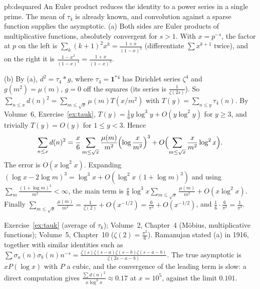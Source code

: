 \begin{solution}{pb:dsquared}
\idea An Euler product reduces the identity to a power series in a single prime. The mean of $\tau_4$ is already known, and convolution against a sparse function supplies the asymptotic.
\writeup (a) Both sides are Euler products of multiplicative functions, absolutely convergent for $s>1$. With $x=p^{-s}$, the
factor at $p$ on the left is $\sum_k(k+1)^2x^k=\frac{1+x}{(1-x)^3}$ (differentiate $\sum x^{k+1}$ twice), and on the right it is
$\frac{1-x^2}{(1-x)^4}=\frac{1+x}{(1-x)^3}$.

(b) By (a), $d^2=\tau_4*g$, where $\tau_4=\mathbf1^{*4}$ has Dirichlet series $\zeta^4$ and $g(m^2)=\mu(m)$, $g=0$ off the squares (its
series is $\frac1{\zeta(2s)}$). So $\sum_{n\le x}d(n)^2=\sum_{m\le\sqrt x}\mu(m)T(x/m^2)$ with $T(y)=\sum_{n\le y}\tau_4(n)$. By Volume~6,
Exercise~\ref{ex:tauk}, $T(y)=\frac16y\log^3y+O(y\log^2y)$ for $y\ge3$, and trivially $T(y)=O(y)$ for $1\le y<3$. Hence
\[
\sum_{n\le x}d(n)^2=\frac x6\sum_{m\le\sqrt x}\frac{\mu(m)}{m^2}\Bigl(\log\frac x{m^2}\Bigr)^3+O\Bigl(\sum_{m\le\sqrt x}\frac x{m^2}\log^2x\Bigr).
\]
The error is $O(x\log^2x)$. Expanding $(\log x-2\log m)^3=\log^3x+O(\log^2x\,(1+\log m)^3)$ and using $\sum_m\frac{(1+\log m)^3}{m^2}<\infty$,
the main term is $\frac x6\log^3x\sum_{m\le\sqrt x}\frac{\mu(m)}{m^2}+O(x\log^2x)$. Finally
$\sum_{m\le\sqrt x}\frac{\mu(m)}{m^2}=\frac1{\zeta(2)}+O(x^{-1/2})=\frac6{\pi^2}+O(x^{-1/2})$, and $\frac16\cdot\frac6{\pi^2}=\frac1{\pi^2}$.

\tools Exercise~\ref{ex:tauk} (average of $\tau_k$); Volume~2, Chapter~4 (Möbius, multiplicative functions); Volume~5, Chapter~10
($\zeta(2)=\frac{\pi^2}6$).
\leads Ramanujan stated (a) in 1916, together with similar identities such as $\sum\sigma_a(n)\sigma_b(n)n^{-s}=\frac{\zeta(s)\zeta(s-a)\zeta(s-b)\zeta(s-a-b)}{\zeta(2s-a-b)}$.
The true asymptotic is $xP(\log x)$ with $P$ a cubic, and the convergence of the leading term is slow: a direct computation gives
$\frac{\sum d(n)^2}{x\log^3x}\approx0.17$ at $x=10^5$, against the limit $0.101$.
\end{solution}

